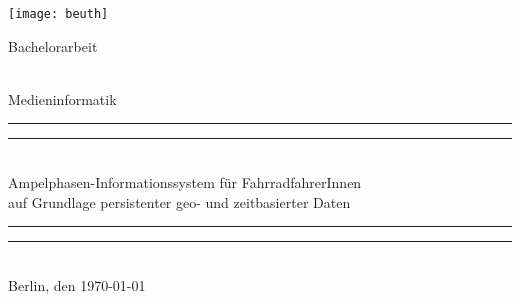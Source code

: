 \begin{titlepage}


\center %
 

\begin{center}
\texttt{[image: beuth]}  \\[1.5cm]
\end{center}

\begin{Huge}
Bachelorarbeit
\end{Huge}\\[0.5cm]
\LARGE{Medieninformatik}\\[0.5cm]

\rule{\textwidth}{1.6pt}\vspace*{-\baselineskip}\vspace*{2pt} %
\rule{\textwidth}{0.4pt}\\[\baselineskip] %
{\LARGE Ampelphasen-Informationssystem für FahrradfahrerInnen\\ auf Grundlage persistenter geo- und zeitbasierter Daten}
\rule{\textwidth}{0.4pt}\vspace*{-\baselineskip}\vspace{3.2pt} %
\rule{\textwidth}{1.6pt}\\[\baselineskip] %

{\Large Berlin, den \today{}} \\[7.5cm]


\end{titlepage}
